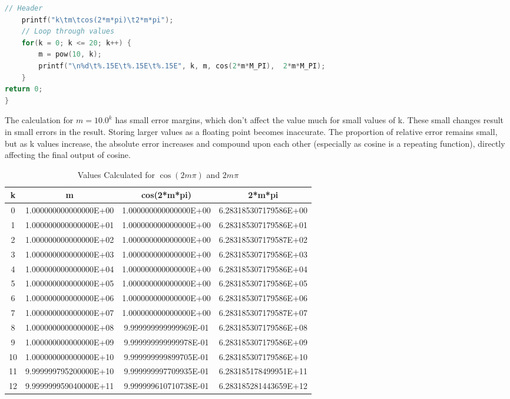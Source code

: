 \documentclass{exam}
\begin{document}
\begin{questions}
\begin{lstlisting}[language=c, frame=single, breaklines=true, label=amb, caption=Code]
	// Header
	printf("k\tm\tcos(2*m*pi)\t2*m*pi");
	// Loop through values
	for(k = 0; k <= 20; k++) {
		m = pow(10, k);
		printf("\n%d\t%.15E\t%.15E\t%.15E", k, m, cos(2*m*M_PI),  2*m*M_PI);
	}
return 0;
}
\end{lstlisting}
\vspace{5mm}
The calculation for $m = 10.0^{k}$ has small error margins, which don't affect the value much for small values of k. These small changes result in small errors in the result. Storing larger values as a floating point becomes inaccurate. The proportion of relative error remains small, but as k values increase, the absolute error increases and compound upon each other (especially as cosine is a repeating function), directly affecting the final output of cosine.
\newpage
\begin{table}[]
\centering
\caption{Values Calculated for $\cos(2m\pi)$ and $2m\pi$}
\begin{tabular}{| c | c | c | c |}
\hline
k & m & cos(2*m*pi) & 2*m*pi \\ \hline
0 & 1.000000000000000E+00 & 1.000000000000000E+00 & 6.283185307179586E+00 \\ \hline
1 & 1.000000000000000E+01 & 1.000000000000000E+00 & 6.283185307179586E+01 \\ \hline
2 & 1.000000000000000E+02 & 1.000000000000000E+00 & 6.283185307179587E+02 \\ \hline
3 & 1.000000000000000E+03 & 1.000000000000000E+00 & 6.283185307179586E+03 \\ \hline
4 & 1.000000000000000E+04 & 1.000000000000000E+00 & 6.283185307179586E+04 \\ \hline
5 & 1.000000000000000E+05 & 1.000000000000000E+00 & 6.283185307179586E+05 \\ \hline
6 & 1.000000000000000E+06 & 1.000000000000000E+00 & 6.283185307179586E+06 \\ \hline
7 & 1.000000000000000E+07 & 1.000000000000000E+00 & 6.283185307179587E+07 \\ \hline
8 & 1.000000000000000E+08 & 9.999999999999969E-01 & 6.283185307179586E+08 \\ \hline
9 & 1.000000000000000E+09 & 9.999999999999978E-01 & 6.283185307179586E+09 \\ \hline
10 & 1.000000000000000E+10 & 9.999999999899705E-01 & 6.283185307179586E+10 \\ \hline
11 & 9.999999795200000E+10 & 9.999999997709935E-01 & 6.283185178499951E+11 \\ \hline
12 & 9.999999959040000E+11 & 9.999999610710738E-01 & 6.283185281443659E+12 \\ \hline

\end{tabular}
\end{table}
\end{questions}
\end{document}
